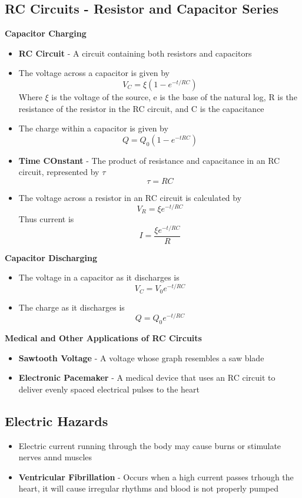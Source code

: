 \subsection{RC Circuits - Resistor and Capacitor Series}
\textbf{Capacitor Charging}
\begin{itemize}
    \item \textbf{RC Circuit} - A circuit containing both resistors and capacitors
    \item The voltage across a capacitor is given by \[V_C=\xi(1-e^{-t/RC})\] Where \(\xi\) is the voltage of the source, e is the base of the natural log, R is the resistance of the resistor in the RC circuit, and C is the capacitance
    \item The charge within a capacitor is given by \[Q=Q_0(1-e^{-tRC})\]
    \item \textbf{Time COnstant} - The product of resistance and capacitance in an RC circuit, represented by \(\tau\) \[\tau=RC\]
    \item The voltage across a resistor in an RC circuit is calculated by \[V_R=\xi e^{-t/RC}\]
    Thus current is \[I=\frac{\xi e^{-t/RC}}{R}\]
\end{itemize}

\textbf{Capacitor Discharging}
\begin{itemize}
    \item The voltage in a capacitor as it discharges is \[V_C=V_0e^{-t/RC}\]
    \item The charge as it discharges is \[Q=Q_0e^{-t/RC}\]
\end{itemize}

\textbf{Medical and Other Applications of RC Circuits}
\begin{itemize}
    \item \textbf{Sawtooth Voltage} - A voltage whose graph resembles a saw blade
    \item \textbf{Electronic Pacemaker} - A medical device that uses an RC circuit to deliver evenly spaced electrical pulses to the heart 
\end{itemize}

\subsection{Electric Hazards}
\begin{itemize}
    \item Electric current running through the body may cause burns or stimulate nerves annd muscles
    \item \textbf{Ventricular Fibrillation} - Occurs when a high current passes trhough the heart, it will cause irregular rhythms and blood is not properly pumped
\end{itemize}

